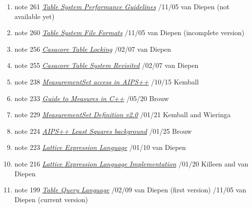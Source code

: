 %

\begin{enumerate}

\item
note 261
\href{261.html}{\textit{Table System Performance Guidelines}}
/11/05 van Diepen (not available yet)

\item
note 260
\href{260.html}{\textit{Table System File Formats}}
/11/05 van Diepen (incomplete version)

\item
note 256
\href{256.html}{\textit{Casacore Table Locking}}
/02/07 van Diepen

\item
note 255
\href{255.html}{\textit{Casacore Table System Revisited}}
/02/07 van Diepen

\item
note 238
\href{238.html}{\textit{MeasurementSet access in AIPS++}}
/10/15 Kemball

\item
note 233
\href{233.html}{\textit{Guide to Measures in C++}}
/05/20 Brouw

\item
note 229
\href{229.html}{\textit{MeasurementSet Definition v2.0}}
/01/21 Kemball and Wieringa

\item
note 224
\href{224.html}{\textit{AIPS++ Least Squares background}}
/01/25 Brouw

\item
note 223
\href{223.html}{\textit{Lattice Expression Language}}
/01/10 van Diepen

\item
note 216
\href{216.html}{\textit{Lattice Expression Language Implementation}}
/01/20 Killeen and van Diepen

\item
note 199
\href{199.html}{\textit{Table Query Language}}
/02/09 van Diepen (first version)
/11/05 van Diepen (current version)


\end{enumerate}
